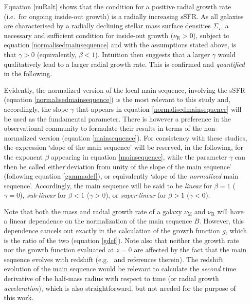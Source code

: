 \documentclass[fleqn,usenatbib]{mnras}
\begin{document}
Equation \eqref{nuRalt} shows that the condition for a positive radial growth rate (i.e.\ for ongoing inside-out growth) is a radially increasing sSFR. As all galaxies are characterised by a radially declining stellar mass surface densities $\Sigma_\star$, a necessary and sufficient condition for inside-out growth ($\nu_\textrm{R} > 0$), subject to equation \eqref{normalisedmainsequence} and with the assumptions stated above, is that $\gamma>0$ (equivalently, $\beta < 1$). Intuition then suggests that a larger $\gamma$ would qualitatively lead to a larger radial growth rate. This is confirmed and \emph{quantified} in the following.

Evidently, the normalized version of the local main sequence, involving the sSFR (equation \ref{normalisedmainsequence}) is the most  relevant to this study and, accordingly, the slope $\gamma$ that appears in equation \eqref{normalisedmainsequence} will be used as the fundamental parameter. There is however a preference in the observational community to formulate their results in terms of the non-normalized version (equation \ref{mainsequence}). For consistency with these studies, the expression `slope of the main sequence' will be reserved, in the following, for the exponent $\beta$ appearing in equation \eqref{mainsequence}, while the parameter $\gamma$ can then be called either`deviation from unity of the slope of the main sequence' (following equation \ref{gammadef}), or equivalently `slope of the \emph{normalized} main sequence'. Accordingly, the main sequence will be said to be \emph{linear} for $\beta =1$ ($\gamma = 0$), \emph{sub-linear} for $\beta < 1$ ($\gamma > 0$), or \emph{super-linear} for $\beta >1$ ($\gamma < 0$).

Note that both the mass and radial growth rate of a galaxy $\nu_\textrm{M}$ and $\nu_\textrm{R}$ will have a linear dependence on the normalization of the main sequence $B$. However, this dependence cancels out exactly in the calculation of the growth function $g$, which is the ratio of the two (equation \ref{gdef}). Note also that neither the growth rate nor the growth function evaluated at $z=0$ are affected by the fact that the main sequence evolves with redshift (e.g.\ \citealt{Sanchez2020} and references therein). The redshift evolution of the main sequence would be relevant to calculate the \emph{second} time derivative of the half-mass radius with respect to time (or radial growth \emph{acceleration}), which is also straightforward, but not needed for the purpose of this work.
\end{document}
